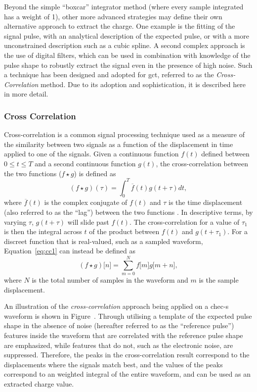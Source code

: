 Beyond the simple ``boxcar'' integrator method (where every sample integrated has a weight of 1), other more advanced strategies may define their own alternative approach to extract the charge. One example is the fitting of the signal pulse, with an analytical description of the expected pulse, or with a more unconstrained description such as a cubic spline. A second complex approach is the use of digital filters, which can be used in combination with knowledge of the pulse shape to robustly extract the signal even in the presence of high noise. Such a technique has been designed and adopted for \gls{gct}, referred to as the \textit{Cross-Correlation} method. Due to its adoption and sophistication, it is described here in more detail. 

\subsubsection{Cross Correlation} \label{section:crosscorrelation}

Cross-correlation is a common signal processing technique used as a measure of the similarity between two signals as a function of the displacement in time applied to one of the signals. Given a continuous function $f(t)$ defined between $0 \le t \le T$ and a second continuous function $g(t)$, the cross-correlation between the two functions ($f \star g$) is defined as 
\begin{equation} \label{eq:cc1}
(f \star g)(\tau) = \int_0^T \overline{f}(t)g(t + \tau)dt,
\end{equation}
where $\overline{f}(t)$ is the complex conjugate of $f(t)$ and $\tau$ is the time displacement (also referred to as the ``lag'') between the two functions \cite{wolfram-crosscorrelate}. In descriptive terms, by varying $\tau$, $g(t + \tau)$ will slide past $f(t)$. The cross-correlation for a value of $\tau_1$ is then the integral across $t$ of the product between $f(t)$ and $g(t + \tau_1)$. For a discreet function that is real-valued, such as a sampled waveform, Equation~\ref{eq:cc1} can instead be defined as
\begin{equation} \label{eq:cc2}
(f \star g)\lbrack n \rbrack = \sum_{m=0}^N f\lbrack m \rbrack g\lbrack m + n\rbrack,
\end{equation}
where $N$ is the total number of samples in the waveform and $m$ is the sample displacement. 

An illustration of the \textit{cross-correlation} approach being applied on a \gls{chec-s} waveform is shown in Figure~. Through utilising a template of the expected pulse shape in the absence of noise (hereafter referred to as the ``reference pulse'') features inside the waveform that are correlated with the reference pulse shape are emphasized, while features that do not, such as the electronic noise, are suppressed. Therefore, the peaks in the cross-correlation result correspond to the displacements where the signals match best, and the values of the peaks correspond to an weighted integral of the entire waveform, and can be used as an extracted charge value.

